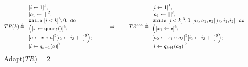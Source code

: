 \documentclass[a4paper,11pt]{article}
\begin{document}
\section{}

\begin{example}
\[
{
TR(k) \triangleq
{
\begin{array}{l}
    \left[i \leftarrow 1 \right]^1 ; \\
    \left[a_1 \leftarrow [] \right]^2; \\
   \ewhile ~ [i < k]^{3}, 0,     ~ \edo ~ \\
    \Big(
     \clabel{x \leftarrow \query() }^4 ; \\
    \clabel{a \leftarrow x :: a }^5  
        \left[i_2 \leftarrow i_3 + 1 \right]^6 
   \Big);\\
    \clabel{l \leftarrow q_{k + 1}(a)}^{7}\\
\end{array}
}
%
~~~~~~~~ \Rightarrow ~~~~~~~
%
TR^{ssa} \triangleq
\begin{array}{l}
    \left[i \leftarrow 1 \right]^1 ; \\
    \left[a_1 \leftarrow [] \right]^2; \\
   \ewhile ~ [i < k]^{3}, 0, 
   [ a_3,a_1,a_2 ] [ i_3,i_1,i_2 ] ~ 
    ~ \edo ~ \\
   \Big( 
     \left[x_1 \leftarrow q \right]^4; \\
    \left[a_2 \leftarrow x_1 :: a_3 \right]^5 
    \left[i_2 \leftarrow i_3 + 1 \right]^6 
    \Big);\\
    \clabel{l \leftarrow q_{k + 1}(a_3)}^{7}\\
\end{array}
}
\]
Adapt($TR$) = 2


\end{example}
\end{document}
